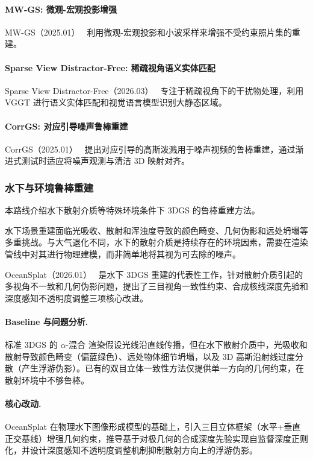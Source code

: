\paragraph{MW-GS: 微观-宏观投影增强}

MW-GS（2025.01）~\cite{2501_14231} 利用微观-宏观投影和小波采样来增强不受约束照片集的重建。

\paragraph{Sparse View Distractor-Free: 稀疏视角语义实体匹配}

Sparse View Distractor-Free（2026.03）~\cite{2603_01603} 专注于稀疏视角下的干扰物处理，利用 VGGT 进行语义实体匹配和视觉语言模型识别大静态区域。

\paragraph{CorrGS: 对应引导噪声鲁棒重建}

CorrGS（2025.01）~\cite{2501_14319} 提出对应引导的高斯泼溅用于噪声视频的鲁棒重建，通过渐进式测试时适应将噪声观测与清洁 3D 映射对齐。

\subsubsection{水下与环境鲁棒重建}

本路线介绍水下散射介质等特殊环境条件下 3DGS 的鲁棒重建方法。

水下场景重建面临光吸收、散射和浑浊度导致的颜色畸变、几何伪影和远处坍塌等多重挑战。与大气退化不同，水下的散射介质是持续存在的环境因素，需要在渲染管线中对其进行物理建模，而非简单地将其视为可去除的噪声。

OceanSplat（2026.01）~\cite{2601_04984} 是水下 3DGS 重建的代表性工作，针对散射介质引起的多视角不一致和几何伪影问题，提出了三目视角一致性约束、合成核线深度先验和深度感知不透明度调整三项核心改进。

\paragraph{Baseline 与问题分析.}标准 3DGS 的 $\alpha$-混合 渲染假设光线沿直线传播，但在水下散射介质中，光吸收和散射导致颜色畸变（偏蓝绿色）、远处物体细节坍塌，以及 3D 高斯沿射线过度分散（产生浮游伪影）。已有的双目立体一致性方法仅提供单一方向的几何约束，在散射环境中不够鲁棒。

\paragraph{核心改动.}OceanSplat 在物理水下图像形成模型的基础上，引入三目立体框架（水平+垂直正交基线）增强几何约束，推导基于对极几何的合成深度先验实现自监督深度正则化，并设计深度感知不透明度调整机制抑制散射方向上的浮游伪影。

